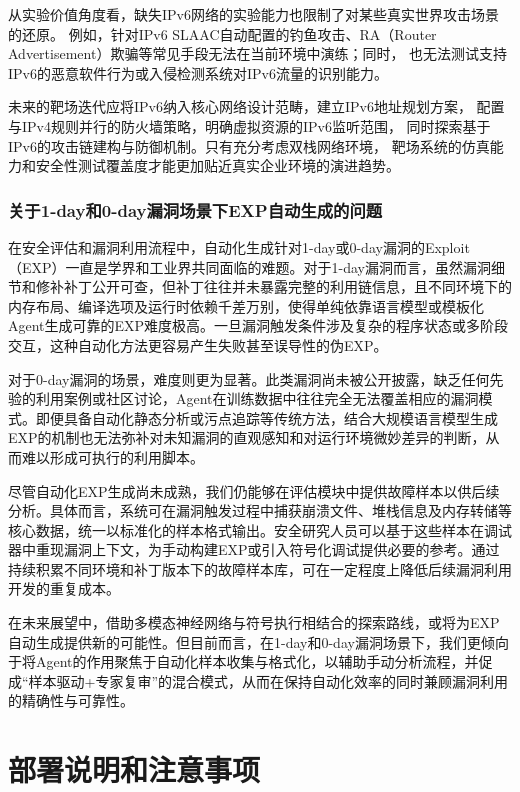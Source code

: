 \documentclass[lang=cn,10pt]{elegantbook}
\begin{document}
从实验价值角度看，缺失IPv6网络的实验能力也限制了对某些真实世界攻击场景的还原。
例如，针对IPv6 SLAAC自动配置的钓鱼攻击、RA（Router Advertisement）欺骗等常见手段无法在当前环境中演练；同时，
也无法测试支持IPv6的恶意软件行为或入侵检测系统对IPv6流量的识别能力。

未来的靶场迭代应将IPv6纳入核心网络设计范畴，建立IPv6地址规划方案，
配置与IPv4规则并行的防火墙策略，明确虚拟资源的IPv6监听范围，
同时探索基于IPv6的攻击链建构与防御机制。只有充分考虑双栈网络环境，
靶场系统的仿真能力和安全性测试覆盖度才能更加贴近真实企业环境的演进趋势。

\subsection{关于1-day和0-day漏洞场景下EXP自动生成的问题}
在安全评估和漏洞利用流程中，自动化生成针对1-day或0-day漏洞的Exploit（EXP）一直是学界和工业界共同面临的难题。对于1-day漏洞而言，虽然漏洞细节和修补补丁公开可查，但补丁往往并未暴露完整的利用链信息，且不同环境下的内存布局、编译选项及运行时依赖千差万别，使得单纯依靠语言模型或模板化Agent生成可靠的EXP难度极高。一旦漏洞触发条件涉及复杂的程序状态或多阶段交互，这种自动化方法更容易产生失败甚至误导性的伪EXP。

对于0-day漏洞的场景，难度则更为显著。此类漏洞尚未被公开披露，缺乏任何先验的利用案例或社区讨论，Agent在训练数据中往往完全无法覆盖相应的漏洞模式。即便具备自动化静态分析或污点追踪等传统方法，结合大规模语言模型生成EXP的机制也无法弥补对未知漏洞的直观感知和对运行环境微妙差异的判断，从而难以形成可执行的利用脚本。

尽管自动化EXP生成尚未成熟，我们仍能够在评估模块中提供故障样本以供后续分析。具体而言，系统可在漏洞触发过程中捕获崩溃文件、堆栈信息及内存转储等核心数据，统一以标准化的样本格式输出。安全研究人员可以基于这些样本在调试器中重现漏洞上下文，为手动构建EXP或引入符号化调试提供必要的参考。通过持续积累不同环境和补丁版本下的故障样本库，可在一定程度上降低后续漏洞利用开发的重复成本。

在未来展望中，借助多模态神经网络与符号执行相结合的探索路线，或将为EXP自动生成提供新的可能性。但目前而言，在1-day和0-day漏洞场景下，我们更倾向于将Agent的作用聚焦于自动化样本收集与格式化，以辅助手动分析流程，并促成“样本驱动+专家复审”的混合模式，从而在保持自动化效率的同时兼顾漏洞利用的精确性与可靠性。



\chapter{部署说明和注意事项}
\hypertarget{chap:deploy}{}
\end{document}
